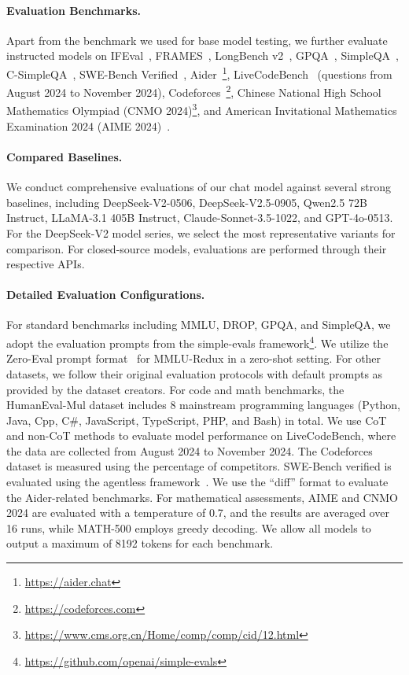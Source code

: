 \documentclass[11pt, a4paper, logo, copyright, nonumbering]{deepseek}
\newcommand{\dsvii}{DeepSeek-V2}
\begin{document}
\begin{CJK*}{UTF8}{gbsn}
\paragraph{Evaluation Benchmarks.}
Apart from the benchmark we used for base model testing, we further evaluate instructed models on IFEval~\citep{IFeval}, FRAMES~\citep{frames}, LongBench v2~\citep{bai2024longbench2}, GPQA~\citep{gpqa}, SimpleQA~\citep{simpleqa}, C-SimpleQA~\citep{csimpleqa}, SWE-Bench Verified~\citep{swe_verified}, Aider~\footnote{\url{https://aider.chat}}, LiveCodeBench~\citep{livecodebench} (questions from August 2024 to November 2024), Codeforces~\footnote{\url{https://codeforces.com}}, Chinese National High School Mathematics Olympiad (CNMO 2024)\footnote{\url{https://www.cms.org.cn/Home/comp/comp/cid/12.html}}, and American Invitational Mathematics Examination 2024 (AIME 2024)~\citep{AIME2024}. 

\paragraph{Compared Baselines.}
We conduct comprehensive evaluations of our chat model against several strong baselines, including \dsvii{}-0506, DeepSeek-V2.5-0905, Qwen2.5 72B Instruct, LLaMA-3.1 405B Instruct, Claude-Sonnet-3.5-1022, and GPT-4o-0513. 
For the \dsvii{} model series, we select the most representative variants for comparison. 
For closed-source models, evaluations are performed through their respective APIs.

\paragraph{Detailed Evaluation Configurations.}
For standard benchmarks including MMLU, DROP, GPQA, and SimpleQA, we adopt the evaluation prompts from the simple-evals framework\footnote{\url{https://github.com/openai/simple-evals}}. 
We utilize the Zero-Eval prompt format~\citep{Lin_ZeroEval_A_Unified_2024} for MMLU-Redux in a zero-shot setting. 
For other datasets, we follow their original evaluation protocols with default prompts as provided by the dataset creators.
For code and math benchmarks, the HumanEval-Mul dataset includes 8 mainstream programming languages (Python, Java, Cpp, C\#, JavaScript, TypeScript, PHP, and Bash) in total. 
We use CoT and non-CoT methods to evaluate model performance on LiveCodeBench, where the data are collected from August 2024 to November 2024. 
The Codeforces dataset is measured using the percentage of competitors. 
SWE-Bench verified is evaluated using the agentless framework~\citep{agentless}. 
We use the ``diff'' format to evaluate the Aider-related benchmarks. 
For mathematical assessments, AIME and CNMO 2024 are evaluated with a temperature of 0.7, and the results are averaged over 16 runs, while MATH-500 employs greedy decoding. 
We allow all models to output a maximum of 8192 tokens for each benchmark. 


\end{CJK*}
\end{document}
